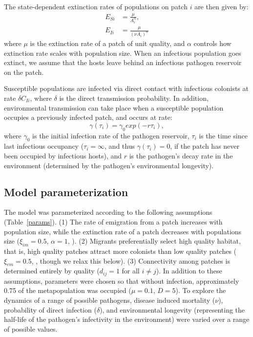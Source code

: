 \documentclass{article}
\begin{document}
The state-dependent extinction rates of populations on patch $i$ are then given by:
\begin{align}
E_{Si} & =\frac{\mu}{A_i^\alpha},\\
E_{Ii} & = \frac{\mu}{(\nu A_i) ^ \alpha}
\end{align}
where $\mu$ is the extinction rate of a patch of unit quality, and $\alpha$ controls how extinction rate scales with population size.  When an infectious population goes extinct, we assume that the hosts leave behind an infectious pathogen reservoir on the patch.  

Susceptible populations are infected via direct contact with infectious colonists at rate $\delta C_{Ii}$, where $\delta$ is the direct transmission probability.  In addition, environmental transmission can take place when a susceptible population occupies a previously infected patch, and occurs at rate:
\begin{equation}
\gamma(\tau_i)=\gamma_0exp(-r\tau_{i}),
\end{equation}
where $\gamma_0$ is the initial infection rate of the pathogen reservoir, $\tau_{i}$ is the time since last infectious occupancy ($\tau_{i} = \infty$, and thus $\gamma(\tau_i) = 0$, if the patch has never been occupied by infectious hosts), and $r$ is the pathogen's decay rate in the environment (determined by the pathogen's environmental longevity).

\subsection{Model parameterization}

The model was parameterized  according to the following assumptions (Table~\ref{params}). (1) The rate of emigration from a patch increases with population size, while the extinction rate of a patch decreases with populations size ($\xi_{im}=0.5$, $\alpha=1$, \cite{Hanski2003}).  (2) Migrants preferentially select high quality habitat, that is, high quality patches attract more colonists than low quality patches ($\xi_{em}=0.5$, \cite{Hanski2003}, though we relax this below).  (3)  Connectivity among patches is determined entirely by quality ($d_{ij}=1$ for all $i \neq j$).  In addition to these assumptions, parameters were chosen so that without infection, approximately 0.75 of the metapopulation was occupied ($\mu = 0.1$, $D=5$).  To explore the dynamics of a range of possible pathogens, disease induced mortality ($\nu$), probability of direct infection ($\delta$), and environmental longevity (representing the half-life of the pathogen's infectivity in the environment) were varied over a range of possible values.
\end{document}
